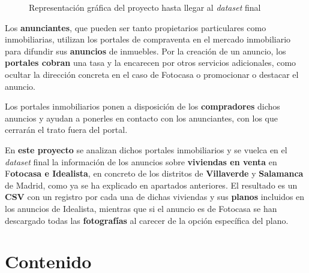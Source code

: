 \documentclass[12pt]{article}
\begin{document}
\begin{figure}[h]
	\centering
	\caption{Representación gráfica del proyecto hasta llegar al \textit{dataset} final}
\end{figure}

Los \textbf{anunciantes}, que pueden ser tanto propietarios particulares como inmobiliarias, utilizan los portales de compraventa en el mercado inmobiliario para difundir sus \textbf{anuncios} de inmuebles. Por la creación de un anuncio, los \textbf{portales cobran} una tasa y la encarecen por otros servicios adicionales, como ocultar la dirección concreta en el caso de Fotocasa o promocionar o destacar el anuncio.

Los portales inmobiliarios ponen a disposición de los \textbf{compradores} dichos anuncios y ayudan a ponerles en contacto con los anunciantes, con los que cerrarán el trato fuera del portal.

En \textbf{este proyecto} se analizan dichos portales inmobiliarios y se vuelca en el \textit{dataset} final la información de los anuncios sobre \textbf{viviendas en venta} en F\textbf{otocasa e Idealista}, en concreto de los distritos de \textbf{Villaverde} y \textbf{Salamanca} de Madrid, como ya se ha explicado en apartados anteriores. El resultado es un \textbf{CSV} con un registro por cada una de dichas viviendas y sus \textbf{planos} incluidos en los anuncios de Idealista, mientras que si el anuncio es de Fotocasa se han descargado todas las \textbf{fotografías} al carecer de la opción específica del plano. 

\vspace{-1.5em}\section{Contenido}\vspace{-1.0em}
\end{document}
